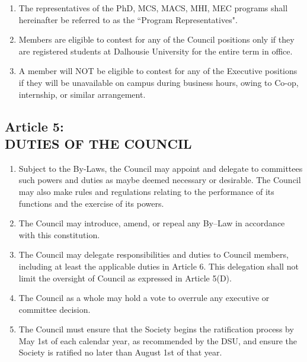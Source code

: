 \documentclass[]{report}
\begin{document}
\begin{enumerate}
\begin{enumerate}[i.]
		\end{enumerate}
		
		\item The representatives of the PhD, MCS, MACS, MHI, MEC programs shall hereinafter be referred to as the ``Program Representatives".
		
		\item Members are eligible to contest for any of the Council positions only if they are registered students at Dalhousie University for the entire term in office.
		
		\item \color{red}A member will NOT be eligible to contest for any of the Executive positions if they will be unavailable on campus during business hours, owing to Co-op, internship, or similar arrangement.
			
	\end{enumerate}


\clearpage
\begin{center}
	\section*{Article 5:\\DUTIES OF THE COUNCIL}
	\vspace{12px}
\end{center}
\label{duties}
	\renewcommand{\theenumi}{\Alph{enumi}}
	\begin{enumerate}
	
		\item Subject to the By-Laws, the Council may appoint and delegate to committees such powers and duties as maybe deemed necessary or desirable. The Council may also make rules and regulations relating to the performance of its functions and the exercise of its powers.
		
		\item The Council may introduce, amend, or repeal any By–Law in accordance with this constitution.
		
		\item The Council may delegate responsibilities and duties to Council members, including at least the applicable duties in Article 6. This delegation shall not limit the oversight of Council as expressed in Article 5(D).
		
		\item The Council as a whole may hold a vote to overrule any executive or committee decision.
		
		\item The Council must ensure that the Society begins the ratification process by May 1st of each calendar year, as recommended by the DSU, and ensure the Society is ratified no later than August 1st of that year.
	
	\end{enumerate}
\end{document}
